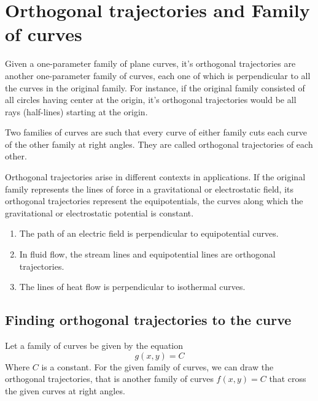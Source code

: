 \section{Orthogonal trajectories and Family of curves}
Given a one-parameter family of plane curves, it's orthogonal trajectories are another
one-parameter family of curves, each one of which is perpendicular to all the curves in the
original family. For instance, if the original family consisted of all circles having center at the origin, it's orthogonal trajectories would be all rays (half-lines) starting at the origin.
\begin{definition}
	Two families of curves are such that every curve of either family cuts each curve of the other family at right angles. They are called orthogonal trajectories of each other.
\end{definition}
Orthogonal trajectories arise in different contexts in applications. If the
original family represents the lines of force in a gravitational or electrostatic field, its orthogonal trajectories represent the equipotentials, the curves along which the gravitational or electrostatic potential is constant.
\begin{example}\hspace{1cm}
	\begin{enumerate}
		\item The path of an electric field is perpendicular to equipotential curves.
		\item  In fluid flow, the stream lines and equipotential lines are orthogonal trajectories.
		\item The lines of heat flow is perpendicular to isothermal curves.
	\end{enumerate}
\end{example}
\subsection{Finding orthogonal trajectories to the curve}
Let a family of curves be given by the equation
$$
g(x, y)=C
$$
Where $C$ is a constant. For the given family of curves, we can draw the orthogonal trajectories, that is another family of curves $f(x, y)=C$ that cross the given curves at right angles.
